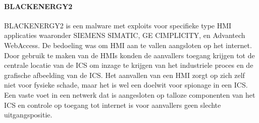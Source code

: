 		
		\paragraph{BLACKENERGY2}
		BLACKENERGY2 is een malware met exploits voor specifieke type HMI applicaties waaronder
		SIEMENS SIMATIC, GE CIMPLICITY, en Advantech WebAccess. De bedoeling was om HMI aan te vallen
		aangsloten op het internet. Door gebruik te maken van de HMIs konden de aanvallers toegang
		krijgen tot de centrale locatie van de ICS om inzage te krijgen van het industriele proces en de
		grafische afbeelding van de ICS. Het aanvallen van een HMI zorgt op zich zelf niet voor fysieke
		schade, maar het is wel een doelwit voor spionage in een ICS. Een vaste voet in een netwerk dat is
		aangesloten op talloze componenten van het ICS en controle op toegang tot internet is voor
		aanvallers geen slechte uitgangspositie.
		
